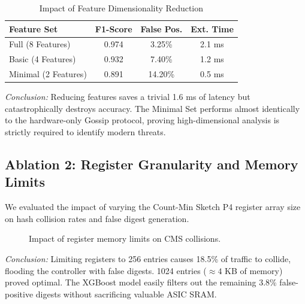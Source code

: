 \documentclass[sigconf, nonacm]{acmart}
\begin{document}
\begin{table}[htbp]
\centering
\caption{Impact of Feature Dimensionality Reduction}
\label{tab:ablation_features}
\renewcommand{\arraystretch}{1.2}
\begin{tabularx}{\columnwidth}{|X|c|c|c|}
\hline
\textbf{Feature Set} & \textbf{F1-Score} & \textbf{False Pos.} & \textbf{Ext. Time} \\
\hline
Full (8 Features) & 0.974 & 3.25\% & 2.1 ms \\ \hline
Basic (4 Features) & 0.932 & 7.40\% & 1.2 ms \\ \hline
Minimal (2 Features) & 0.891 & 14.20\% & 0.5 ms \\ \hline
\end{tabularx}
\end{table}
\textit{Conclusion:} Reducing features saves a trivial 1.6 ms of latency but catastrophically destroys accuracy. The Minimal Set performs almost identically to the hardware-only Gossip protocol, proving high-dimensional analysis is strictly required to identify modern threats.

\subsection{Ablation 2: Register Granularity and Memory Limits}
We evaluated the impact of varying the Count-Min Sketch P4 register array size on hash collision rates and false digest generation. 

\begin{figure}[h]
\centering
{}
\caption{Impact of register memory limits on CMS collisions.}
\label{fig:ablation_memory}
\end{figure}
\textit{Conclusion:} Limiting registers to 256 entries causes 18.5\% of traffic to collide, flooding the controller with false digests. 1024 entries ($\approx 4$ KB of memory) proved optimal. The XGBoost model easily filters out the remaining 3.8\% false-positive digests without sacrificing valuable ASIC SRAM.
\end{document}
